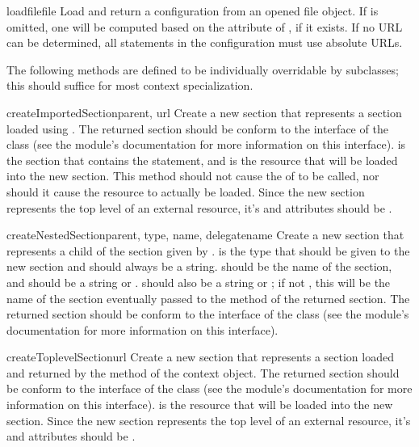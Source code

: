 \documentclass{howto}
\begin{document}
\begin{methoddesc}{loadfile}{file}
  Load and return a configuration from an opened file object.
  If  is omitted, one will be computed based on the
   attribute of , if it exists.  If no URL can
  be determined, all  statements in the configuration
  must use absolute URLs.
\end{methoddesc}

The following methods are defined to be individually overridable by
subclasses; this should suffice for most context specialization.

\begin{methoddesc}{createImportedSection}{parent, url}
  Create a new section that represents a section loaded using
  .  The returned section should be conform to the
  interface of the  class (see the
   module's documentation for more
  information on this interface).   is the section that
  contains the  statement, and  is the
  resource that will be loaded into the new section.  This method
  should not cause the  of  to be
  called, nor should it cause the resource to actually be loaded.
  Since the new section represents the top level of an external
  resource, it's  and  attributes should be
  .
\end{methoddesc}

\begin{methoddesc}{createNestedSection}{parent, type, name, delegatename}
  Create a new section that represents a child of the section given by
  .   is the type that should be given to the
  new section and should always be a string.   should be the
  name of the section, and should be a string or .
   should also be a string or ; if not
  , this will be the name of the section eventually passed
  to the  method of the returned section.  The
  returned section should be conform to the interface of the
   class (see the 
  module's documentation for more information on this interface).
\end{methoddesc}

\begin{methoddesc}{createToplevelSection}{url}
  Create a new section that represents a section loaded and returned
  by the  method of the context object.  The returned
  section should be conform to the interface of the
   class (see the
   module's documentation for more
  information on this interface).   is the resource that will
  be loaded into the new section.
  Since the new section represents the top level of an external
  resource, it's  and  attributes should be
  .
\end{methoddesc}
\end{document}
